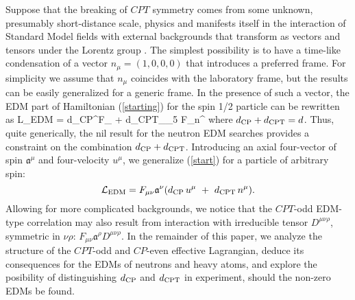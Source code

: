 \documentclass[prl,twocolumn,tightenlines,preprintnumbers,floatfix,nofootinbib]{revtex4}
\begin{document}
Suppose that the breaking of $CPT$ symmetry comes from 
some unknown, presumably short-distance scale, physics and 
manifests itself in the interaction of Standard Model fields with
external backgrounds that transform as vectors and tensors 
under the Lorentz group \cite{Kost,CG}. The simplest possibility
is to have a time-like condensation of a vector $n_\mu = (1,0,0,0)$
that introduces a preferred frame. For simplicity we assume that 
$n_\mu $ coincides with the laboratory frame, but the results can be easily generalized for
a generic frame. In the presence of such a vector, 
the EDM part of Hamiltonian (\ref{starting}) for the spin 1/2 particle can be rewritten 
as 
\be
{\cal L}_{\rm EDM} = d_{\rm CP}\ov \psi \sigma^{\mu\nu}F_{\mu\nu} \psi 
+ d_{\rm CPT}\psi \gamma_\mu\gamma_5 \psi F_{\mu\nu}n^{\nu}
\label{start}
\ee
where $d_{\rm CP}+d_{\rm CPT}=d$. 
Thus, quite generically, 
the nil result for the neutron EDM searches provides a constraint on the combination 
$d_{\rm CP}+d_{\rm CPT}$.
Introducing an axial four-vector of spin $ \mathfrak{a}^\mu $ and four-velocity $u^\mu$, 
we generalize (\ref{start}) for a particle of arbitrary spin:
\begin{equation}
\label{arb_spin}
{\cal L}_{\rm EDM} =F_{\mu\nu} \mathfrak{a}^{\nu} (d_{\rm CP}\,u^\mu
	~+~
	d_{\rm CPT}\, n^\mu ).
\end{equation}
Allowing for more complicated backgrounds, we notice that the $CPT$-odd EDM-type correlation
may also result from interaction with irreducible tensor $D^{\mu\nu\rho}$, symmetric in 
$\nu\rho$: $F_{\mu\nu} \mathfrak{a}^{\rho}D^{\mu\nu\rho}$.
In the remainder of this paper, we analyze the structure of the 
$CPT$-odd and $CP$-even effective Lagrangian, deduce its consequences 
for the EDMs of neutrons and heavy atoms, and explore the posibility of 
distinguishing 
$d_{\rm CP}$ and $d_{\rm CPT}$ in experiment, should the non-zero EDMs be found. 
\end{document}
